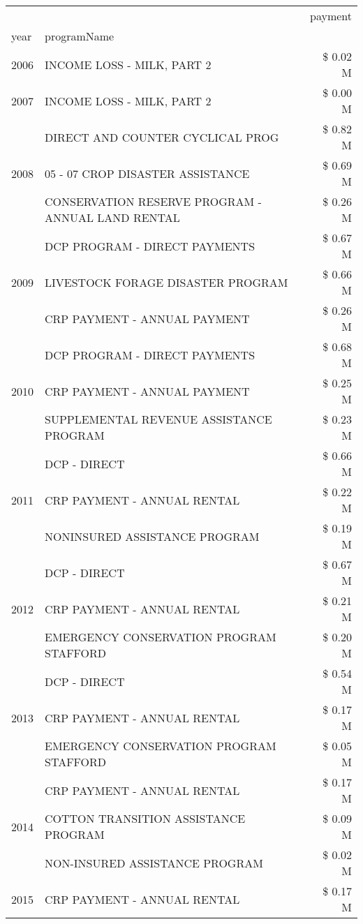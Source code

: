 \begin{tabular}{llr}
\toprule
 &  & payment \\
year & programName &  \\
\midrule
2006 & INCOME LOSS - MILK, PART 2 & \$ 0.02 M \\
\cline{1-3}
2007 & INCOME LOSS - MILK, PART 2 & \$ 0.00 M \\
\cline{1-3}
\multirow[t]{3}{*}{2008} & DIRECT AND COUNTER CYCLICAL PROG & \$ 0.82 M \\
 & 05 - 07 CROP DISASTER ASSISTANCE & \$ 0.69 M \\
 & CONSERVATION RESERVE PROGRAM - ANNUAL LAND RENTAL & \$ 0.26 M \\
\cline{1-3}
\multirow[t]{3}{*}{2009} & DCP PROGRAM - DIRECT PAYMENTS & \$ 0.67 M \\
 & LIVESTOCK FORAGE DISASTER  PROGRAM & \$ 0.66 M \\
 & CRP PAYMENT - ANNUAL PAYMENT & \$ 0.26 M \\
\cline{1-3}
\multirow[t]{3}{*}{2010} & DCP PROGRAM - DIRECT PAYMENTS & \$ 0.68 M \\
 & CRP PAYMENT - ANNUAL PAYMENT & \$ 0.25 M \\
 & SUPPLEMENTAL REVENUE ASSISTANCE PROGRAM & \$ 0.23 M \\
\cline{1-3}
\multirow[t]{3}{*}{2011} & DCP - DIRECT & \$ 0.66 M \\
 & CRP PAYMENT - ANNUAL RENTAL & \$ 0.22 M \\
 & NONINSURED ASSISTANCE PROGRAM & \$ 0.19 M \\
\cline{1-3}
\multirow[t]{3}{*}{2012} & DCP - DIRECT & \$ 0.67 M \\
 & CRP PAYMENT - ANNUAL RENTAL & \$ 0.21 M \\
 & EMERGENCY CONSERVATION PROGRAM STAFFORD & \$ 0.20 M \\
\cline{1-3}
\multirow[t]{3}{*}{2013} & DCP - DIRECT & \$ 0.54 M \\
 & CRP PAYMENT - ANNUAL RENTAL & \$ 0.17 M \\
 & EMERGENCY CONSERVATION PROGRAM STAFFORD & \$ 0.05 M \\
\cline{1-3}
\multirow[t]{3}{*}{2014} & CRP PAYMENT - ANNUAL RENTAL & \$ 0.17 M \\
 & COTTON TRANSITION ASSISTANCE PROGRAM & \$ 0.09 M \\
 & NON-INSURED ASSISTANCE PROGRAM & \$ 0.02 M \\
\cline{1-3}
\multirow[t]{3}{*}{2015} & CRP PAYMENT - ANNUAL RENTAL & \$ 0.17 M \\

\end{tabular}
